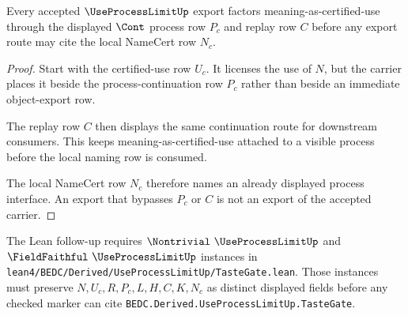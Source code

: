 \begin{theorem}
\label{thm:use-process-limit-certified-use-process-interface}
Every accepted $\UseProcessLimitUp$ export factors meaning-as-certified-use through the displayed $\Cont$ process row $P_c$ and replay row $C$ before any export route may cite the local NameCert row $N_c$.
\end{theorem}
\begin{proof}
Start with the certified-use row $U_c$. It licenses the use of $N$, but the carrier places it beside the process-continuation row $P_c$ rather than beside an immediate object-export row.

The replay row $C$ then displays the same continuation route for downstream consumers. This keeps meaning-as-certified-use attached to a visible process before the local naming row is consumed.

The local NameCert row $N_c$ therefore names an already displayed process interface. An export that bypasses $P_c$ or $C$ is not an export of the accepted carrier.
\end{proof}



The Lean follow-up requires $\Nontrivial\ \UseProcessLimitUp$ and $\FieldFaithful\ \UseProcessLimitUp$ instances in \texttt{lean4/BEDC/Derived/UseProcessLimitUp/TasteGate.lean}. Those instances must preserve $N,U_c,R,P_c,L,H,C,K,N_c$ as distinct displayed fields before any checked marker can cite \texttt{BEDC.Derived.UseProcessLimitUp.TasteGate}.


